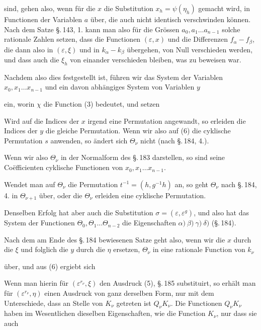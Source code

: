 
sind, gehen also, wenn für die $x$ die Substitution $x_h = \psi(\eta_h)$ gemacht wird, in Functionen der Variablen $a$ über, die auch nicht identisch verschwinden können. Nach dem Satze \S.\,143, 1. kann man also für die Grössen $a_0, a_1 \ldots a_{n-1}$ solche rationale Zahlen setzen, dass die Functionen $(\varepsilon, x)$ und die Differenzen $f_\alpha - f_\beta$, die dann also in $(\varepsilon, \xi)$ und in $k_\alpha - k_\beta$ übergehen, von Null verschieden werden, und dass auch die $\xi_h$ von einander verschieden bleiben, was zu beweisen war.

Nachdem also dies festgestellt ist, führen wir das System der Variablen $x_0, x_1 \ldots x_{n-1}$ und ein davon abhängiges System von Variablen $y$


ein, worin $\chi$ die Function (3) bedeutet, und setzen


Wird auf die Indices der $x$ irgend eine Permutation angewandt, so erleiden die Indices der $y$ die gleiche Permutation. Wenn wir also auf (6) die cyklische Permutation $s$ anwenden, so ändert sich $\Theta_\nu$ nicht (nach \S.\,184, 4.).

Wenn wir also $\Theta_\nu$ in der Normalform des \S.\,183 darstellen, so sind seine Coëfficienten cyklische Functionen von $x_0, x_1 \ldots x_{n-1}$.

Wendet man auf $\Theta_\nu$ die Permutation $t^{-1} = (h, g^{-1}h)$ an, so geht $\Theta_\nu$ nach \S.\,184, 4. in $\Theta_{\nu+1}$ über, oder die $\Theta_\nu$ erleiden eine cyklische Permutation.

Denselben Erfolg hat aber auch die Substitution $\sigma = (\varepsilon, \varepsilon^g)$, und also hat das System der Functionen $\Theta_0, \Theta_1 \ldots \Theta_{n-2}$ die Eigenschaften $\alpha)\ \beta)\ \gamma)\ \delta)$ (\S.\,184).

Nach dem am Ende des \S.\,184 bewiesenen Satze geht also, wenn wir die $x$ durch die $\xi$ und folglich die $y$ durch die $\eta$ ersetzen, $\Theta_\nu$ in eine rationale Function von $k_\nu$


über, und aus (6) ergiebt sich


Wenn man hierin für $(\varepsilon^{r_\nu}, \xi)$ den Ausdruck (5), \S.\,185 substituirt, so erhält man für $(\varepsilon^{r_\nu}, \eta)$ einen Ausdruck von ganz derselben Form, nur mit dem Unterschiede, dass an Stelle von $K_\nu$ getreten ist $Q_\nu K_\nu$. Die Functionen $Q_\nu K_\nu$ haben im Wesentlichen dieselben Eigenschaften, wie die Function $K_\nu$, nur dass sie auch
